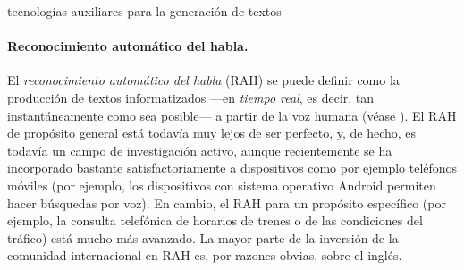 \begin{persabermes}{tecnologías auxiliares para la generación de textos} \paragraph{Reconocimiento automático del habla.} El \emph{reconocimiento automático del habla} (RAH) se puede definir como la producción de textos informatizados ---en \emph{tiempo real}, es decir, tan instantáneamente como sea posible--- a partir de la voz humana (véase \citealt{samuelson-brown96b}). El RAH de propósito general está todavía muy lejos de ser perfecto, y, de hecho, es todavía un campo de investigación activo, aunque recientemente se ha incorporado bastante satisfactoriamente a dispositivos como por ejemplo teléfonos móviles (por ejemplo, los dispositivos con sistema operativo Android permiten hacer búsquedas por voz). En cambio, el RAH para un propósito específico (por ejemplo, la consulta telefónica de horarios de trenes o de las condiciones del tráfico) está mucho más avanzado. La mayor parte de la inversión de la comunidad internacional en RAH es, por razones obvias, sobre el inglés. 


\end{persabermes}
